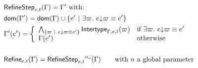 \documentclass[a4paper]{article}
\theoremstyle{definition}
\begin{document}
    \begin{align*}
      &\textsf{RefineStep}_{e,t} (\Gamma) = \Gamma' \text{ with:}\\
      &\textsf{dom}(\Gamma')=\textsf{dom}(\Gamma) \cup \{e' ~|~ \exists \varpi.\ e{\downarrow}\varpi \equiv e'\}\\
      &\Gamma'(e') = 
        \left\{\begin{array}{ll}
          \bigwedge_{\{\varpi ~|~ e{\downarrow}\varpi \equiv e'\}}
          \textsf{Intertype}_{\Gamma,e,t} (\varpi) & \text{if } \exists \varpi.\ e{\downarrow}\varpi \equiv e' \\
          \Gamma(e') & \text{otherwise}
        \end{array}\right.\\&\\
      &\textsf{Refine}_{e,t}(\Gamma)={\textsf{RefineStep}_{e,t}}^{n_o}(\Gamma)\qquad\text{with $n$ a global parameter}
    \end{align*}
\end{document}
